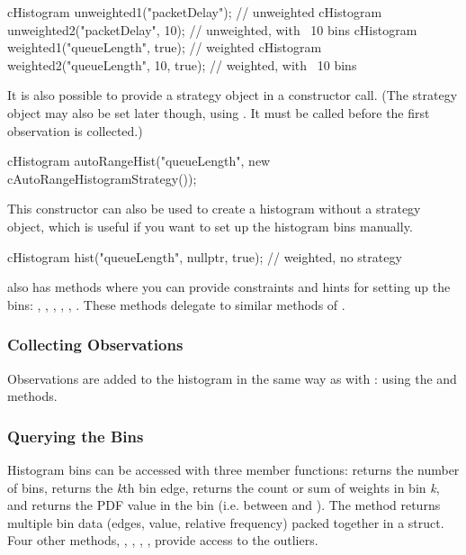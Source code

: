 \begin{cpp}
cHistogram unweighted1("packetDelay");  // unweighted
cHistogram unweighted2("packetDelay", 10);  // unweighted, with ~10 bins
cHistogram weighted1("queueLength", true); // weighted
cHistogram weighted2("queueLength", 10, true); // weighted, with ~10 bins
\end{cpp}

It is also possible to provide a strategy object in a constructor call.
(The strategy object may also be set later though, using .
It must be called before the first observation is collected.)

\begin{cpp}
cHistogram autoRangeHist("queueLength", new cAutoRangeHistogramStrategy());
\end{cpp}

This constructor can also be used to create a histogram without a strategy
object, which is useful if you want to set up the histogram bins manually.

\begin{cpp}
cHistogram hist("queueLength", nullptr, true); // weighted, no strategy
\end{cpp}

 also has methods where you can provide constraints
and hints for setting up the bins: , ,
, ,
, . These methods
delegate to similar methods of .


\subsubsection{Collecting Observations}
\label{sec:sim-lib:collecting-observations}

Observations are added to the histogram in the same way as with :
using the  and  methods.

\subsubsection{Querying the Bins}
\label{sec:sim-lib:querying-bins}

Histogram bins can be accessed with three member functions:
 returns the number of bins,
 returns the \textit{k}th bin edge,
 returns the count or sum of weights in bin \textit{k},
and  returns the PDF value in the bin
(i.e. between  and ).
The  method returns multiple bin data
(edges, value, relative frequency) packed together in a struct.
Four other methods, , ,
, , provide access to
the outliers.

